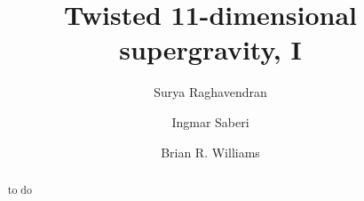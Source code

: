 \documentclass[11pt]{amsart}
\begin{document}
\title{Twisted 11-dimensional supergravity, I}
\author{Surya Raghavendran}
\address{Perimeter Institute for Theoretical Physics \\ 31 Caroline Street North \\ 
Waterloo, Ontario N2L 2Y5\\ Canada}
\author{Ingmar Saberi}
\address{Ludwig-Maximilians-Universit\"at M\"unchen \\ Fakult\"at f\"ur Physik \\ Theresienstra\ss{}e 37 \\ 80333 M\"unchen \\ Deutschland}
\author{Brian R. Williams}
\address{School of Mathematics \\ University of Edinburgh \\ Edinburgh EH9 3FD \\ Scotland}
\begin{abstract}
to do
\end{abstract}
\maketitle

\tableofcontents

\newpage 

 














\end{document}
